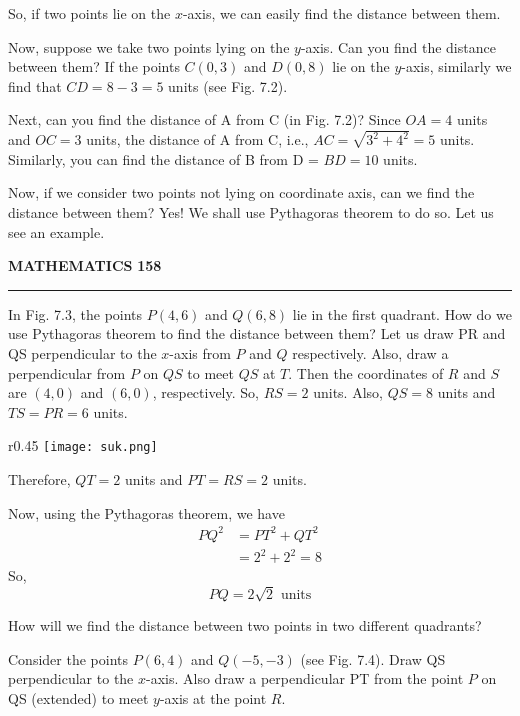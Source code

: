 \documentclass[11pt]{article}
\begin{document}
So, if two points lie on the \(x\)-axis, we can easily find the distance between them.

Now, suppose we take two points lying on the \(y\)-axis. Can you find the distance between them? If the points \(C(0, 3)\) and \(D(0, 8)\) lie on the \(y\)-axis, similarly we find that \(CD = 8 - 3 = 5\) units (see Fig. 7.2).

Next, can you find the distance of A from C (in Fig. 7.2)? Since \(OA = 4\) units and \(OC = 3\) units, the distance of A from C, i.e., \(AC = \sqrt{3^2 + 4^2} = 5\) units. Similarly, you can find the distance of B from D = \(BD = 10\) units.

Now, if we consider two points not lying on coordinate axis, can we find the distance between them? Yes! We shall use Pythagoras theorem to do so. Let us see an example.

{\color{ncertblue}\textbf{MATHEMATICS}} \hfill \textbf{158}
{\color{ncertblue}\noindent\rule{\textwidth}{0.5pt}}

In Fig. 7.3, the points \(P(4, 6)\) and \(Q(6, 8)\) lie in the first quadrant. How do we use Pythagoras theorem to find the distance between them? Let us draw PR and QS perpendicular to the \(x\)-axis from \(P\) and \(Q\) respectively. Also, draw a perpendicular from \(P\) on \(QS\) to meet \(QS\) at \(T\). Then the coordinates of \(R\) and \(S\) are \((4, 0)\) and \((6, 0)\), respectively. So, \(RS = 2\) units. Also, \(QS = 8\) units and \(TS = PR = 6\) units.

\begin{wrapfigure}{r}{0.45\textwidth}
    \centering
    \vspace{-1em}
    \texttt{[image: suk.png]}
    \vspace{-1em}
\end{wrapfigure}

Therefore, \(QT = 2\) units and \(PT = RS = 2\) units.

Now, using the Pythagoras theorem, we have
\[
\begin{aligned}
PQ^2 &= PT^2 + QT^2 \\
     &= 2^2 + 2^2 = 8
\end{aligned}
\]
So,
\[
PQ = 2\sqrt{2} \text{ units}
\]

How will we find the distance between two points in two different quadrants?

Consider the points \(P(6, 4)\) and \(Q(-5, -3)\) (see Fig. 7.4). Draw QS perpendicular to the \(x\)-axis. Also draw a perpendicular PT from the point \(P\) on QS (extended) to meet \(y\)-axis at the point \(R\).
\end{document}

